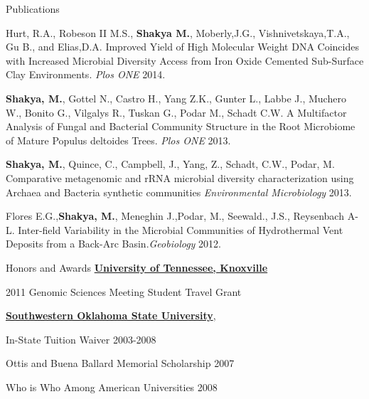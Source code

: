 \documentclass{resume} %
\begin{document}
\begin{rSection}{Publications}
\item Hurt, R.A., Robeson II M.S., \textbf{Shakya M.}, Moberly,J.G., Vishnivetskaya,T.A., Gu B., and Elias,D.A. Improved Yield of High Molecular Weight DNA Coincides with Increased Microbial Diversity Access from Iron Oxide Cemented Sub-Surface Clay Environments. \textit{Plos ONE} 2014.
 \item \textbf{Shakya, M.}, Gottel N., Castro H., Yang Z.K., Gunter L., Labbe J., Muchero W., Bonito G., Vilgalys R., Tuskan G., Podar M., Schadt C.W. A Multifactor Analysis of Fungal and Bacterial Community Structure in the Root Microbiome of Mature Populus deltoides Trees. \textit{Plos ONE} 2013. 
\item \textbf{Shakya, M.}, Quince, C., Campbell, J., Yang, Z., Schadt, C.W., Podar, M. Comparative metagenomic and rRNA microbial diversity characterization using Archaea and Bacteria synthetic communities \textit{Environmental Microbiology} 2013.
\item Flores E.G.,\textbf{Shakya, M.}, Meneghin J.,Podar, M., Seewald., J.S., Reysenbach A-L. Inter-field Variability in the Microbial Communities of Hydrothermal Vent Deposits from a Back-Arc Basin.\textit{Geobiology} 2012. 
\end{rSection}


\begin{rSection}{Honors and Awards}
\href{http://www.utk.edu}{\textbf{University of Tennessee, Knoxville}}
\item 2011 Genomic Sciences Meeting Student Travel Grant

\item \href{http://www.swosu.edu}{\textbf{Southwestern Oklahoma State University}},
\item In-State Tuition Waiver 2003-2008
\item Ottis and Buena Ballard Memorial Scholarship 2007
\item Who is Who Among American Universities 2008
\end{rSection}

\end{document}
